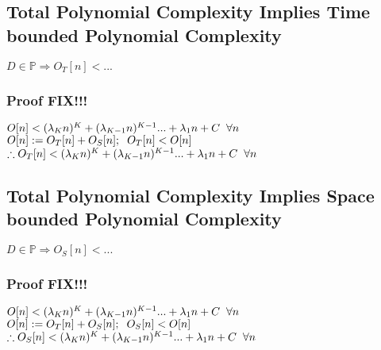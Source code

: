 \documentclass[11pt]{article}
\begin{document}
\subsection{Total Polynomial Complexity Implies Time bounded Polynomial Complexity}
\begin{center}
\vspace{1mm}
$
D \in \mathbb{P} \Longrightarrow O_T[n] < ...
$
\end{center}

\subsubsection{Proof FIX!!!}
\begin{center}
$
O[n] < (\lambda_K n)^K + (\lambda_{K-1} n)^{K-1}... + \lambda_1 n + C \hspace{2mm} \forall n
$
\\ \vspace{2mm}
$
O[n] := O_T[n] + O_S[n]; \hspace{2mm} O_T[n] < O[n]
$
\\ \vspace{2mm}
$
\therefore O_T[n] < (\lambda_K n)^K + (\lambda_{K-1} n)^{K-1}... + \lambda_1 n + C \hspace{2mm} \forall n
$
\end{center}










\subsection{Total Polynomial Complexity Implies Space bounded Polynomial Complexity}
\begin{center}
\vspace{1mm}
$
D \in \mathbb{P} \Longrightarrow O_S[n] < ...
$
\end{center}

\subsubsection{Proof FIX!!!}
\begin{center}
$
O[n] < (\lambda_K n)^K + (\lambda_{K-1} n)^{K-1}... + \lambda_1 n + C \hspace{2mm} \forall n
$
\\ \vspace{2mm}
$
O[n] := O_T[n] + O_S[n]; \hspace{2mm} O_S[n] < O[n]
$
\\ \vspace{2mm}
$
\therefore O_S[n] < (\lambda_K n)^K + (\lambda_{K-1} n)^{K-1}... + \lambda_1 n + C \hspace{2mm} \forall n
$
\end{center}
\end{document}
